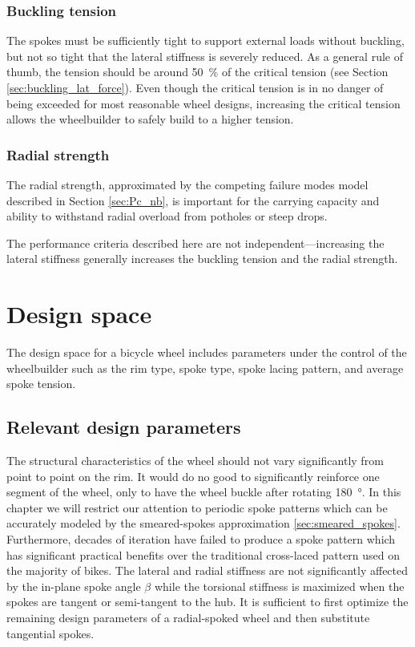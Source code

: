 \documentclass[\rootdir/thesis.tex]{subfiles}
\begin{document}
\subsubsection*{Buckling tension}
The spokes must be sufficiently tight to support external loads without buckling, but not so tight that the lateral stiffness is severely reduced. As a general rule of thumb, the tension should be around \SI{50}{\percent} of the critical tension (see Section \ref{sec:buckling_lat_force}). Even though the critical tension is in no danger of being exceeded for most reasonable wheel designs, increasing the critical tension allows the wheelbuilder to safely build to a higher tension.

\subsubsection*{Radial strength}
The radial strength, approximated by the competing failure modes model described in Section \ref{sec:Pc_nb}, is important for the carrying capacity and ability to withstand radial overload from potholes or steep drops.

The performance criteria described here are not independent---increasing the lateral stiffness generally increases the buckling tension and the radial strength.


\section{Design space}

The design space for a bicycle wheel includes parameters under the control of the wheelbuilder such as the rim type, spoke type, spoke lacing pattern, and average spoke tension.

\subsection{Relevant design parameters}


The structural characteristics of the wheel should not vary significantly from point to point on the rim. It would do no good to significantly reinforce one segment of the wheel, only to have the wheel buckle after rotating \SI{180}{\degree}. In this chapter we will restrict our attention to periodic spoke patterns which can be accurately modeled by the smeared-spokes approximation \ref{sec:smeared_spokes}. Furthermore, decades of iteration have failed to produce a spoke pattern which has significant practical benefits over the traditional cross-laced pattern used on the majority of bikes. The lateral and radial stiffness are not significantly affected by the in-plane spoke angle $\beta$ while the torsional stiffness is maximized when the spokes are tangent or semi-tangent to the hub. It is sufficient to first optimize the remaining design parameters of a radial-spoked wheel and then substitute tangential spokes.
\end{document}
